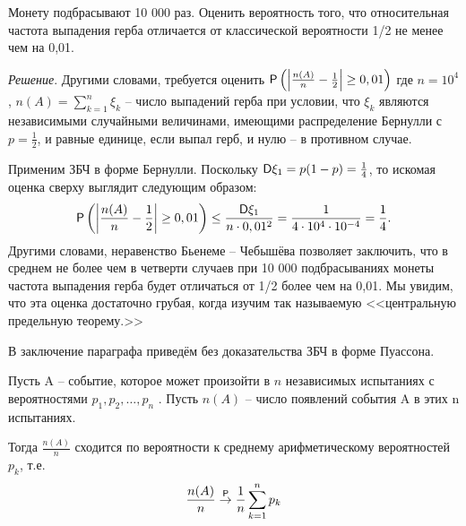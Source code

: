 \begin{example}
\label{ex:22.7}
Монету подбрасывают 10 000 раз. Оценить вероятность
того, что относительная частота выпадения герба отличается от классической вероятности 1/2 не менее чем на 0,01.

\textit{Решение}. Другими словами, требуется оценить 
$
	\P\left(\left|
		\frac{n(A)}{n}-
		\frac{1}{2}
	\right|\geq0,01\right)
$
где $n = 10^4$, $n(A) = \sum\limits_{k=1}^n \xi_k$  -- число выпадений герба при условии, что $\xi_k$ являются независимыми случайными величинами, имеющими распределение Бернулли с $p = \frac{1}{2}$, и равные единице, если выпал герб, и нулю -- в противном случае. 

Применим ЗБЧ в форме Бернулли. Поскольку $\D\xi_1 = p(1 - p) = \frac{1}{4}$, то искомая оценка сверху выглядит следующим образом:
$$
	\P\left(\left|
		\frac{n(A)}{n}-
		\frac{1}{2}
	\right|\geq0,01\right)\leq
	\frac{\D\xi_1}{n\cdot 0,01^2}=\frac{1}{4\cdot10^4\cdot10^{-4}}=\frac{1}{4}.
$$
Другими словами, неравенство Бьенеме – Чебышёва позволяет заключить, что в среднем не более чем в четверти случаев при 10 000 подбрасываниях монеты частота выпадения герба будет отличаться от 1/2 более чем на 0,01. Мы увидим, что эта оценка достаточно грубая, когда изучим так называемую <<центральную предельную теорему.>>
\end{example}

В заключение параграфа приведём без доказательства ЗБЧ в форме Пуассона.
\begin{theorem}
\label{th:22.8}

Пусть A -- событие, которое может произойти в $n$ независимых испытаниях с вероятностями $p_1 , p_2 , \ldots , p_n$ . Пусть $n(A)$ -- число появлений события A в этих n испытаниях. 

Тогда $\frac{n(A)}{n}$ сходится по вероятности к среднему арифметическому вероятностей $p_k$, т.е.
$$
	\frac{n(A)}{n}\stackrel{\P}{\to}\frac{1}{n}\sum\limits_{k=1}^n p_k
$$

\end{theorem}

